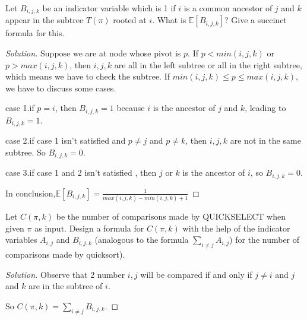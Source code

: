 


\maketitle

\begin{thm}{}{}
    Let $B_{i,j,k}$ be an indicator variable which is 1 if $i$ is a common ancestor of  $j$ and $k$ appear in the subtree $T(\pi)$ rooted at $i$.
    What is $\mathbb{E}[B_{i,j,k}]$? Give a succinct formula for this.
\end{thm}

\begin{proof}[Solution]
  	Suppose we are at node whose pivot is $p$. If $p< min(i,j,k)$ or $p>max(i,j,k)$, then $i,j,k$ are all in the left subtree or all in the right subtree, which means we have to check the subtree.
  	If $min(i,j,k)\le p \le max(i,j,k)$, we have to discuss some cases.
  	
  	case 1.if $p=i$, then $B_{i,j,k}=1$ because $i$ is the ancestor of $j$ and $k$, leading to $B_{i,j,k}=1$.
  	
  	case 2.if case 1 isn't satisfied and $p\ne j$ and $p\ne k$, then $i,j,k$ are not in the same subtree. So $B_{i,j,k}=0$.
  	
  	case 3.if case 1 and 2 isn't satisfied , then $j$ or $k$ is the ancestor of $i$, so $B_{i,j,k}=0$.
  	
  	In conclusion,$\mathbb{E}[B_{i,j,k}]=\frac{1}{max(i,j,k)-min(i,j,k)+1}$
\end{proof}



\begin{thm}{}{}
	Let $C(\pi,k)$ be the number of comparisons made by QUICKSELECT	when given $\pi$ as input. Design a formula for $C(\pi,k)$ with the help of the indicator variables $A_{i,j}$ and $B_{i,j,k}$ (analogous to the formula $\sum_{i\ne j}A_{i,j}$) for the number of comparisons made by quicksort).
	
\end{thm}

\begin{proof}[Solution]
	Observe that 2 number $i,j$ will be compared if and only if $j\ne i$ and $j$ and $k$ are in the subtree of $i$.
	
	So $C(\pi,k)=\sum_{i\ne j}B_{i,j,k}$.
\end{proof}





